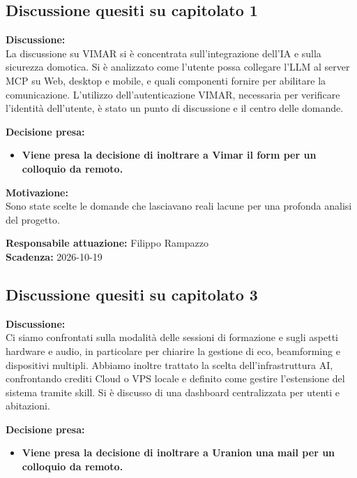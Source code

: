 \documentclass[12pt,a4paper]{article}
\newcommand{\tightlist}{\setlength{\itemsep}{1pt}\setlength{\parskip}{0pt}}
\begin{document}
\hypertarget{argomento-1}{%
\subsection{Discussione quesiti su capitolato 1}}

\textbf{Discussione:} \\
{
La discussione su VIMAR si è concentrata sull'integrazione dell'IA e sulla sicurezza domotica. Si è analizzato come l'utente possa collegare l'LLM al server MCP su Web, desktop e mobile, e quali componenti fornire per abilitare la comunicazione. L'utilizzo dell'autenticazione VIMAR, necessaria per verificare l'identità dell'utente, è stato un punto di discussione e il centro delle domande.
 }

\textbf{Decisione presa:}
\begin{itemize}
\tightlist
\item[$\checkmark$] \textbf {Viene presa la decisione di inoltrare a Vimar il form per un colloquio da remoto.}
\end{itemize}

\textbf{Motivazione:} \\
{Sono state scelte le domande che lasciavano reali lacune per una profonda analisi del progetto.}

\textbf{Responsabile attuazione:} Filippo Rampazzo \\
\textbf{Scadenza:} 2026-10-19

\hypertarget{argomento-2}{%
\subsection{Discussione quesiti su capitolato 3}}

\textbf{Discussione:} \\
{
Ci siamo confrontati sulla modalità delle sessioni di formazione e sugli aspetti hardware e audio, in particolare per chiarire la gestione di eco, beamforming e dispositivi multipli. Abbiamo inoltre trattato la scelta dell'infrastruttura AI, confrontando  crediti Cloud o VPS locale e definito come gestire l'estensione del sistema tramite skill. Si è discusso di una dashboard centralizzata per utenti e abitazioni.
}

\textbf{Decisione presa:}
\begin{itemize}
\tightlist
\item[$\checkmark$] \textbf {Viene presa la decisione di inoltrare a Uranion una mail per un colloquio da remoto.}
\end{itemize}
\end{document}
